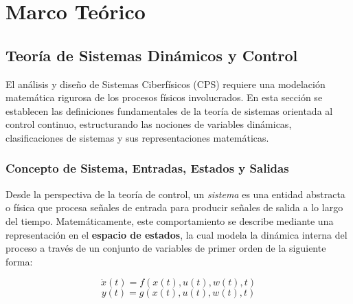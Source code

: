 \chapter{Marco Teórico}
	\label{sec:teorico}




\section{Teoría de Sistemas Dinámicos y Control}

El análisis y diseño de Sistemas Ciberfísicos (CPS) requiere una modelación matemática rigurosa de los procesos físicos involucrados. En esta sección se establecen las definiciones fundamentales de la teoría de sistemas orientada al control continuo, estructurando las nociones de variables dinámicas, clasificaciones de sistemas y sus representaciones matemáticas.

\subsection{Concepto de Sistema, Entradas, Estados y Salidas}

Desde la perspectiva de la teoría de control, un \textit{sistema} es una entidad abstracta o física que procesa señales de entrada para producir señales de salida a lo largo del tiempo. Matemáticamente, este comportamiento se describe mediante una representación en el \textbf{espacio de estados}, la cual modela la dinámica interna del proceso a través de un conjunto de variables de primer orden de la siguiente forma:

\begin{equation}
    \dot{x}(t) = f(x(t), u(t), w(t), t)
    \label{eq:estado_general}
\end{equation}
\begin{equation}
    y(t) = g(x(t), u(t), w(t), t)
    \label{eq:salida_general}
\end{equation}

